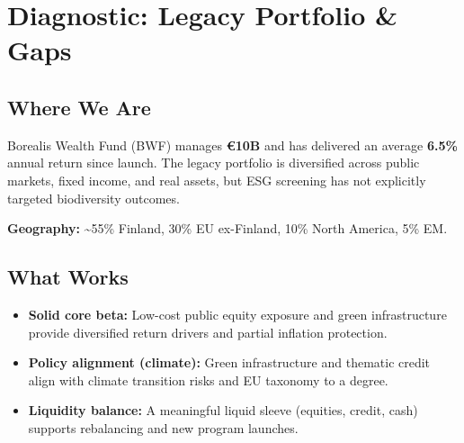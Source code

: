 \section*{Diagnostic: Legacy Portfolio \& Gaps}

\subsection*{Where We Are}
Borealis Wealth Fund (BWF) manages \textbf{€10B} and has delivered an average \textbf{6.5\%} annual return since launch. The legacy portfolio is diversified across public markets, fixed income, and real assets, but ESG screening has not explicitly targeted biodiversity outcomes.

\begin{table}[h!]
\centering
{}
\caption{Legacy portfolio overview by strategic sleeve (percent shares inferred from case totals).}
\end{table}

\noindent \textbf{Geography:} \textasciitilde 55\% Finland, 30\% EU ex-Finland, 10\% North America, 5\% EM.

\vspace{0.5em}
\subsection*{What Works}
\begin{itemize}[leftmargin=*, itemsep=2pt]
    \item \textbf{Solid core beta:} Low-cost public equity exposure and green infrastructure provide diversified return drivers and partial inflation protection.
    \item \textbf{Policy alignment (climate):} Green infrastructure and thematic credit align with climate transition risks and EU taxonomy to a degree.
    \item \textbf{Liquidity balance:} A meaningful liquid sleeve (equities, credit, cash) supports rebalancing and new program launches.
\end{itemize}

